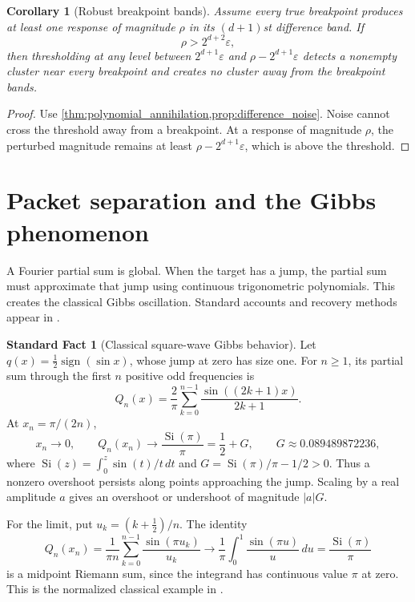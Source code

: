 \documentclass{aomart}
\newtheorem{corollary}[corollary]{Corollary}
\theoremstyle{definition}
\newtheorem{standardfact}[standardfact]{Standard Fact}
\theoremstyle{remark}
\begin{document}
\begin{corollary}[Robust breakpoint bands]\label{cor:robust_breakpoint_bands}
Assume every true breakpoint produces at least one response of magnitude \(\rho\) in its \((d+1)\)st difference band. If
\[
\rho>2^{d+2}\varepsilon,
\]
then thresholding at any level between \(2^{d+1}\varepsilon\) and \(\rho-2^{d+1}\varepsilon\) detects a nonempty cluster near every breakpoint and creates no cluster away from the breakpoint bands.
\end{corollary}

\begin{proof}
Use \cref{thm:polynomial_annihilation,prop:difference_noise}. Noise cannot cross the threshold away from a breakpoint. At a response of magnitude \(\rho\), the perturbed magnitude remains at least \(\rho-2^{d+1}\varepsilon\), which is above the threshold.
\end{proof}

\section{Packet separation and the Gibbs phenomenon}\label{sec:gibbs}

A Fourier partial sum is global. When the target has a jump, the partial sum must approximate that jump using continuous trigonometric polynomials. This creates the classical Gibbs oscillation. Standard accounts and recovery methods appear in \cite{Zygmund2002,GottliebShu1997}.

\begin{standardfact}[Classical square-wave Gibbs behavior]\label{sf:gibbs_behavior}
Let \(q(x)=\tfrac12\operatorname{sign}(\sin x)\), whose jump at zero has size one. For \(n\geq1\), its partial sum through the first \(n\) positive odd frequencies is
\[
Q_n(x)=\frac{2}{\pi}\sum_{k=0}^{n-1}\frac{\sin((2k+1)x)}{2k+1}.
\]
At \(x_n=\pi/(2n)\),
\[
x_n\longrightarrow0,\qquad Q_n(x_n)\longrightarrow\frac{\operatorname{Si}(\pi)}{\pi}
=\frac12+G,\qquad G\approx0.089489872236,
\]
where \(\operatorname{Si}(z)=\int_0^z\sin(t)/t\,dt\) and \(G=\operatorname{Si}(\pi)/\pi-1/2>0\).
Thus a nonzero overshoot persists along points approaching the jump. Scaling by a real amplitude \(a\) gives an overshoot or undershoot of magnitude \(|a|G\).

For the limit, put \(u_k=(k+\tfrac12)/n\). The identity
\[
Q_n(x_n)=\frac{1}{\pi n}\sum_{k=0}^{n-1}\frac{\sin(\pi u_k)}{u_k}
\longrightarrow\frac1\pi\int_0^1\frac{\sin(\pi u)}u\,du
=\frac{\operatorname{Si}(\pi)}{\pi}
\]
is a midpoint Riemann sum, since the integrand has continuous value \(\pi\) at zero. This is the normalized classical example in \cite[Section~6.16(i), equations~6.16.1--6.16.4]{DLMFGibbs}.
\end{standardfact}
\end{document}
